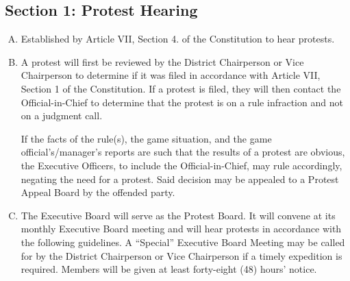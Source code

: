 \documentclass[letteraper,10pt,oneside,draft]{memoir}
\begin{document}
\subsection{Section 1: Protest Hearing}
\begin{enumerate}[A.]
    \item Established by Article VII, Section 4. of the Constitution to hear protests.
    \item A protest will first be reviewed by the District Chairperson or Vice Chairperson to determine if it was filed in accordance with Article VII, Section 1 of the Constitution.  If a protest is filed, they will then contact the Official-in-Chief to determine that the protest is on a rule infraction and not on a judgment call.
    
    If the facts of the rule(s), the game situation, and the game official’s/manager’s reports are such that the results of a protest are obvious, the Executive Officers, to include the Official-in-Chief, may rule accordingly, negating the need for a protest.  Said decision may be appealed to a Protest Appeal Board by the offended party.
    \item The Executive Board will serve as the Protest Board. It will convene at its monthly Executive Board meeting and will hear protests in accordance with the following guidelines. A “Special” Executive Board Meeting may be called for by the District Chairperson or Vice Chairperson if a timely expedition is required. Members will be given at least forty-eight (48) hours’ notice.
\end{enumerate}
\end{document}

